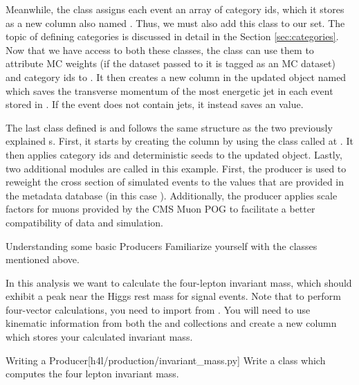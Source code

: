 Meanwhile, the  class assigns each event an array of category ids, which it stores as a new column also named . Thus, we must also add this class to our  set. The topic of defining categories is discussed in detail in the Section \ref{sec:categories}. Now that we have access to both these  classes, the  class can use them to attribute MC weights (if the dataset passed to it is tagged as an MC dataset) and category ids to . It then creates a new column in the updated  object named  which saves the transverse momentum of the most energetic jet in each event stored in . If the event does not contain jets, it instead saves an  value. 

The last  class defined is  and follows the same structure as the  two previously explained s.
First, it starts by creating the  column by using the  class  called at .
It then applies category ids and deterministic seeds to the updated  object.
Lastly, two additional modules are called in this example.
First, the  producer is used to reweight the cross section of simulated events to the values that are provided in the metadata database (in this case ).
Additionally, the  producer applies scale factors for muons provided by the CMS Muon POG to facilitate a better compatibility of data and simulation.

\begin{exercise}{Understanding some basic Producers}
	Familiarize yourself with the  classes mentioned above.
\end{exercise}

In this  analysis we want to calculate the four-lepton invariant mass, which should exhibit a peak near the Higgs rest mass for signal events.
Note that to perform four-vector calculations, you need to import  from .
You will need to use kinematic information from both the  and  collections and create a new column which stores your calculated invariant mass.

\begin{exercise}{Writing a Producer}[h4l/production/invariant\_mass.py]
	Write a  class which computes the four lepton invariant mass. 
\end{exercise}
